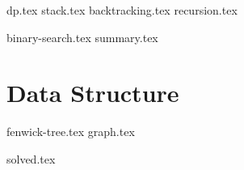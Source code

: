 \documentclass{../latex-setting/cmemoir}
\begin{document}

\frontmatter

\tableofcontents

\restoregeometry%

\mainmatter{}


{dp.tex}
{stack.tex}
{backtracking.tex}
{recursion.tex}

{binary-search.tex}
{summary.tex}



\part{Data Structure}
{fenwick-tree.tex}
{graph.tex}

{solved.tex}
% 
\end{document}
